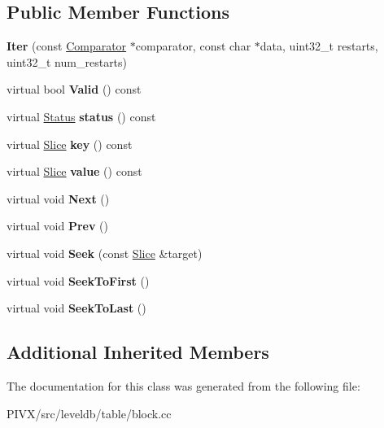 \subsection*{Public Member Functions}
\begin{DoxyCompactItemize}
\item 
\mbox{\label{classleveldb_1_1_block_1_1_iter_a31b124ec1fc5750b31b182dc44282588}} 
{\bfseries Iter} (const \mbox{\hyperlink{structleveldb_1_1_comparator}{Comparator}} $\ast$comparator, const char $\ast$data, uint32\+\_\+t restarts, uint32\+\_\+t num\+\_\+restarts)
\item 
\mbox{\label{classleveldb_1_1_block_1_1_iter_a8fa2be549a032cd010ee722ffd4af28f}} 
virtual bool {\bfseries Valid} () const
\item 
\mbox{\label{classleveldb_1_1_block_1_1_iter_a767cbcc1a9baa95b8eed089a5997897c}} 
virtual \mbox{\hyperlink{classleveldb_1_1_status}{Status}} {\bfseries status} () const
\item 
\mbox{\label{classleveldb_1_1_block_1_1_iter_ab762e46fcf9e06ef85c876ed4c92b1e3}} 
virtual \mbox{\hyperlink{classleveldb_1_1_slice}{Slice}} {\bfseries key} () const
\item 
\mbox{\label{classleveldb_1_1_block_1_1_iter_a1cf66d3bb0fb70a706c95aaba9f03011}} 
virtual \mbox{\hyperlink{classleveldb_1_1_slice}{Slice}} {\bfseries value} () const
\item 
\mbox{\label{classleveldb_1_1_block_1_1_iter_a27dacbefa903333a5ad003ccd3e424b6}} 
virtual void {\bfseries Next} ()
\item 
\mbox{\label{classleveldb_1_1_block_1_1_iter_a096747ff77d5090579fe4cd4e464a3c9}} 
virtual void {\bfseries Prev} ()
\item 
\mbox{\label{classleveldb_1_1_block_1_1_iter_a3dcefc0609937b33c046ac7fafb52ad7}} 
virtual void {\bfseries Seek} (const \mbox{\hyperlink{classleveldb_1_1_slice}{Slice}} \&target)
\item 
\mbox{\label{classleveldb_1_1_block_1_1_iter_aecc19bb6d8a219e7fb8e695fb5b57bd3}} 
virtual void {\bfseries Seek\+To\+First} ()
\item 
\mbox{\label{classleveldb_1_1_block_1_1_iter_a3007d98d17a03138c629fc2b2eb56204}} 
virtual void {\bfseries Seek\+To\+Last} ()
\end{DoxyCompactItemize}
\subsection*{Additional Inherited Members}


The documentation for this class was generated from the following file\+:\begin{DoxyCompactItemize}
\item 
P\+I\+V\+X/src/leveldb/table/block.\+cc\end{DoxyCompactItemize}
